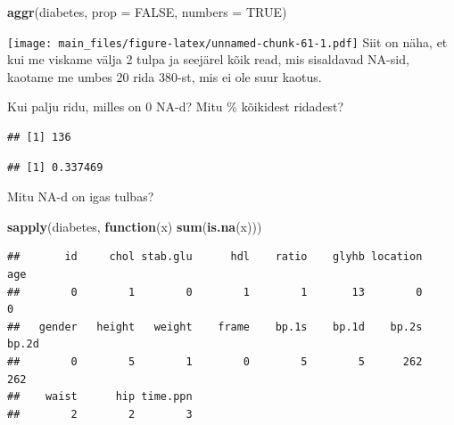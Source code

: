 \documentclass[]{book}
\newenvironment{Shaded}{\begin{snugshade}}{\end{snugshade}}
\newcommand{\KeywordTok}[1]{\textcolor[rgb]{0.13,0.29,0.53}{\textbf{#1}}}
\newcommand{\DataTypeTok}[1]{\textcolor[rgb]{0.13,0.29,0.53}{#1}}
\newcommand{\StringTok}[1]{\textcolor[rgb]{0.31,0.60,0.02}{#1}}
\newcommand{\CommentTok}[1]{\textcolor[rgb]{0.56,0.35,0.01}{\textit{#1}}}
\newcommand{\OtherTok}[1]{\textcolor[rgb]{0.56,0.35,0.01}{#1}}
\newcommand{\ControlFlowTok}[1]{\textcolor[rgb]{0.13,0.29,0.53}{\textbf{#1}}}
\newcommand{\OperatorTok}[1]{\textcolor[rgb]{0.81,0.36,0.00}{\textbf{#1}}}
\newcommand{\NormalTok}[1]{#1}
\begin{document}
\begin{Shaded}
\begin{Highlighting}[]
\KeywordTok{aggr}\NormalTok{(diabetes, }\DataTypeTok{prop =} \OtherTok{FALSE}\NormalTok{, }\DataTypeTok{numbers =} \OtherTok{TRUE}\NormalTok{)}
\end{Highlighting}
\end{Shaded}

\texttt{[image: main\_files/figure-latex/unnamed-chunk-61-1.pdf]} Siit on
näha, et kui me viskame välja 2 tulpa ja seejärel kõik read, mis
sisaldavad NA-sid, kaotame me umbes 20 rida 380-st, mis ei ole suur
kaotus.

Kui palju ridu, milles on 0 NA-d? Mitu \% kõikidest ridadest?

\begin{Shaded}
\end{Shaded}

\begin{verbatim}
## [1] 136
\end{verbatim}

\begin{Shaded}
\end{Shaded}

\begin{verbatim}
## [1] 0.337469
\end{verbatim}

Mitu NA-d on igas tulbas?

\begin{Shaded}
\begin{Highlighting}[]
\KeywordTok{sapply}\NormalTok{(diabetes, }\ControlFlowTok{function}\NormalTok{(x) }\KeywordTok{sum}\NormalTok{(}\KeywordTok{is.na}\NormalTok{(x))) }
\end{Highlighting}
\end{Shaded}

\begin{verbatim}
##       id     chol stab.glu      hdl    ratio    glyhb location      age 
##        0        1        0        1        1       13        0        0 
##   gender   height   weight    frame    bp.1s    bp.1d    bp.2s    bp.2d 
##        0        5        1        0        5        5      262      262 
##    waist      hip time.ppn 
##        2        2        3
\end{verbatim}
\end{document}
